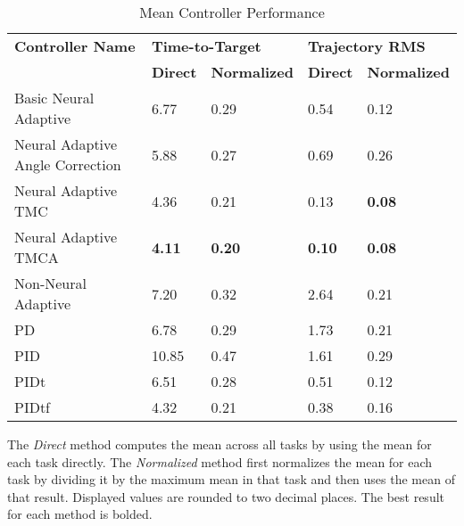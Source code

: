 \documentclass[letterpaper,12pt,titlepage,oneside,final]{book}
\begin{document}
\begin{table}
\begin{threeparttable}
\caption{Mean Controller Performance} \label{table:mean_task_ranking}
\begin{tabular}{| l | l | l | l | l |}
\hline
\textbf{Controller Name} & \multicolumn{2}{l|}{\textbf{Time-to-Target}} & \multicolumn{2}{l|}{\textbf{Trajectory RMS}} \\ \cline{2-5}
& \textbf{Direct} & \textbf{Normalized} & \textbf{Direct} & \textbf{Normalized} \\ \hline
Basic Neural Adaptive & 6.77 & 0.29 & 0.54 & 0.12 \\ \hline
Neural Adaptive Angle Correction & 5.88 & 0.27 & 0.69 & 0.26 \\ \hline
Neural Adaptive TMC & 4.36 & 0.21 & 0.13 & \textbf{0.08} \\ \hline
Neural Adaptive TMCA & \textbf{4.11} & \textbf{0.20} & \textbf{0.10} & \textbf{0.08} \\ \hline
Non-Neural Adaptive & 7.20 & 0.32 & 2.64 & 0.21 \\ \hline
PD & 6.78 & 0.29 & 1.73 & 0.21 \\ \hline
PID & 10.85 & 0.47 & 1.61 & 0.29 \\ \hline
PIDt & 6.51 & 0.28 & 0.51 & 0.12 \\ \hline
PIDtf & 4.32 & 0.21 & 0.38 & 0.16 \\ \hline
\end{tabular}
\begin{tablenotes}
\footnotesize
\item The \textit{Direct} method computes the mean across all tasks by using the mean for each task directly. The \textit{Normalized} method first normalizes the mean for each task by dividing it by the maximum mean in that task and then uses the mean of that result. Displayed values are rounded to two decimal places. The best result for each method is bolded.
\end{tablenotes}
\end{threeparttable}
\end{table}
\end{document}
